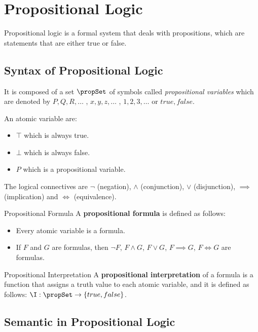 \chapter{Propositional Logic}
\label{cha:Propositional Logic}

Propositional logic is a formal system that deals with propositions,
which are statements that are either true or false.

\section{Syntax of Propositional Logic}
\label{sec:Syntax of Propositional Logic}

It is composed of a set $\propSet$ of symbols called \textit{propositional variables}
which are denoted by $P,Q,R,\dots$ , $x,y,z,\dots$ , $1,2,3,\dots$ or $true , false$.

An atomic variable are:
\begin{itemize}
    \item $\top$ which is always true.
    \item $\bot$ which is always false.
    \item $P$ which is a propositional variable.
\end{itemize}

The logical connectives are $\neg$ (negation), $\land$ (conjunction), $\lor$ (disjunction),
$\implies$ (implication) and $\iff$ (equivalence).

\begin{definition}{Propositional Formula}
    A \textbf{propositional formula} is defined as follows:
    \begin{itemize}
        \item Every atomic variable is a formula.
        \item If $F$ and $G$ are formulas, then $\neg F$, $F \land G$, $F \lor G$, 
        $F \implies G$, $F \iff G$ are formulas.
    \end{itemize}    
\end{definition}

\begin{definition}{Propositional Interpretation}
    A \textbf{propositional interpretation} of a formula is a function that assigns 
    a truth value to each atomic variable, and it is defined as follows: 
    $\I : \propSet \to \{true,false\}$.    
\end{definition}

\section{Semantic in Propositional Logic}
\label{sec:Satisfiability in Propositional Logic}

